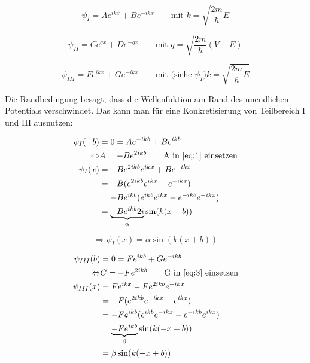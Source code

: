 \begin{equation}
  \label{eq:1}
  \psi_I = Ae^{ikx}+Be^{-ikx} \qquad \text{mit } k = \sqrt{\frac{2m}{\hbar}E}
\end{equation}

\begin{equation}
  \label{eq:2}
  \psi_{II} = Ce^{q x}+De^{-qx}\qquad \text{mit } q = \sqrt{\frac{2m}{\hbar}(V-E)}
\end{equation}

\begin{equation}
  \label{eq:3}
  \psi_{III} = Fe^{ikx}+Ge^{-ikx}\qquad \text{mit (siehe }\psi_{I}) k = \sqrt{\frac{2m}{\hbar}E}
\end{equation}


Die Randbedingung besagt, dass die Wellenfuktion am Rand des unendlichen  Potentials verschwindet. Das kann man für eine Konkretisierung von Teilbereich I und III ausnutzen:

\begin{align}
  \label{eq:4}
  \psi_{I}(-b) &= 0 = Ae^{-ikb}+Be^{ikb} \notag \\
\Leftrightarrow & A = -Be^{2ikb}\qquad\text{A in }\ref{eq:1}\text{ einsetzen} \notag\\
\psi_I(x)&=-Be^{2ikb}e^{ikx}+Be^{-ikx} \notag \\
&=-B(e^{2ikb}e^{ikx}-e^{-ikx}) \notag\\
&=-B e^{ikb}(e^{ikb}e^{ikx}-e^{-ikb}e^{-ikx}) \notag\\
&=\underbrace{-B e^{ikb}2i}_{\alpha}\sin(k(x+b))
\end{align}

\begin{equation}
  \label{eq:5}
  \Rightarrow \psi_I(x)=\alpha\sin(k(x+b))
\end{equation}

\begin{align}
  \label{eq:6}
  \psi_{III}(b) &= 0 = Fe^{ikb}+Ge^{-ikb} \notag \\
\Leftrightarrow & G = -Fe^{2ikb}\qquad\text{G in }\ref{eq:3}\text{ einsetzen} \notag\\
\psi_{III}(x)&=Fe^{ikx} -Fe^{2ikb} e^{-ikx} \notag \\
&=-F(e^{2ikb}e^{-ikx}-e^{ikx}) \notag\\
&=-Fe^{ikb}(e^{ikb}e^{-ikx}-e^{-ikb}e^{ikx}) \notag\\
&=\underbrace{-Fe^{ikb} }_{\beta}\sin(k(-x+b)) \notag\\
&=\beta\sin(k(-x+b))
\end{align}

